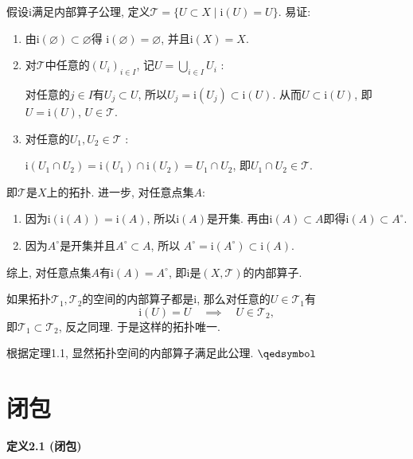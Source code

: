 \documentclass[UTF8]{ctexart}
\begin{document}
假设$\mathrm{i}$满足内部算子公理,
定义$\mathcal{T}=\{U\subset X\mid\mathrm{i}(U)=U\}$. 易证:
\begin{enumerate}
    \item 由$\mathrm{i}(\varnothing)\subset\varnothing$得
    $\mathrm{i}(\varnothing)=\varnothing$, 并且$\mathrm{i}(X)=X$.
    \item 对$\mathcal{T}$中任意的$(U_i)_{i\in I}$,
    记$\displaystyle U=\bigcup_{i\in I}U_i$ :
    
    \vspace{3pt}\hspace{2.17em}
    对任意的$j\in I$有$U_j\subset U$, 所以$U_j=\mathrm{i}(U_j)\subset\mathrm{i}(U)$.
    从而$U\subset\mathrm{i}(U)$, 即$U=\mathrm{i}(U)$, $U\in\mathcal{T}$.
    \item 对任意的$U_1,U_2\in\mathcal{T}$ :
    
    \hspace{2.17em}
    $\mathrm{i}(U_1\cap U_2)=\mathrm{i}(U_1)\cap\mathrm{i}(U_2)=U_1\cap U_2$,
    即$U_1\cap U_2\in\mathcal{T}$.
\end{enumerate}
即$\mathcal{T}$是$X$上的拓扑. 进一步, 对任意点集$A$:
\begin{enumerate}
    \item 因为$\mathrm{i}(\mathrm{i}(A))=\mathrm{i}(A)$, 所以$\mathrm{i}(A)$是开集.
    再由$\mathrm{i}(A)\subset A$即得$\mathrm{i}(A)\subset A^\circ$.
    \item 因为$A^\circ$是开集并且$A^\circ\subset A$, 所以
    $A^\circ=\mathrm{i}(A^\circ)\subset\mathrm{i}(A)$.
\end{enumerate}
综上, 对任意点集$A$有$\mathrm{i}(A)=A^\circ$,
即$\mathrm{i}$是$(X,\mathcal{T})$的内部算子.

如果拓扑$\mathcal{T}_1,\mathcal{T}_2$的空间的内部算子都是$\mathrm{i}$,
那么对任意的$U\in\mathcal{T}_1$有
\[
    \mathrm{i}(U)=U\quad\implies\quad U\in\mathcal{T}_2,
\]
即$\mathcal{T}_1\subset\mathcal{T}_2$, 反之同理. 于是这样的拓扑唯一.


根据定理1.1, 显然拓扑空间的内部算子满足此公理. \hfill $\qedsymbol$





\newpage

\section{闭包}

\hypertarget{sec:定义2.1}{}
\noindent\textbf{定义2.1 (闭包)}
\end{document}
